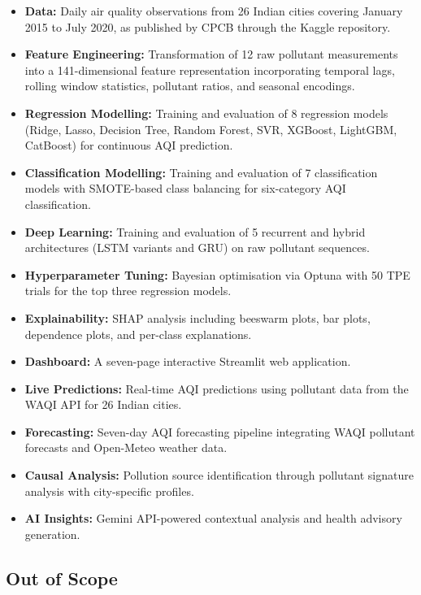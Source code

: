 \documentclass[12pt,a4paper]{report}
\begin{document}
\begin{itemize}[leftmargin=2cm]
    \item \textbf{Data:} Daily air quality observations from 26 Indian cities covering January 2015 to July 2020, as published by CPCB through the Kaggle repository.
    \item \textbf{Feature Engineering:} Transformation of 12 raw pollutant measurements into a 141-dimensional feature representation incorporating temporal lags, rolling window statistics, pollutant ratios, and seasonal encodings.
    \item \textbf{Regression Modelling:} Training and evaluation of 8 regression models (Ridge, Lasso, Decision Tree, Random Forest, SVR, XGBoost, LightGBM, CatBoost) for continuous AQI prediction.
    \item \textbf{Classification Modelling:} Training and evaluation of 7 classification models with SMOTE-based class balancing for six-category AQI classification.
    \item \textbf{Deep Learning:} Training and evaluation of 5 recurrent and hybrid architectures (LSTM variants and GRU) on raw pollutant sequences.
    \item \textbf{Hyperparameter Tuning:} Bayesian optimisation via Optuna with 50 TPE trials for the top three regression models.
    \item \textbf{Explainability:} SHAP analysis including beeswarm plots, bar plots, dependence plots, and per-class explanations.
    \item \textbf{Dashboard:} A seven-page interactive Streamlit web application.
    \item \textbf{Live Predictions:} Real-time AQI predictions using pollutant data from the WAQI API for 26 Indian cities.
    \item \textbf{Forecasting:} Seven-day AQI forecasting pipeline integrating WAQI pollutant forecasts and Open-Meteo weather data.
    \item \textbf{Causal Analysis:} Pollution source identification through pollutant signature analysis with city-specific profiles.
    \item \textbf{AI Insights:} Gemini API-powered contextual analysis and health advisory generation.
\end{itemize}

\subsection{Out of Scope}
\end{document}
